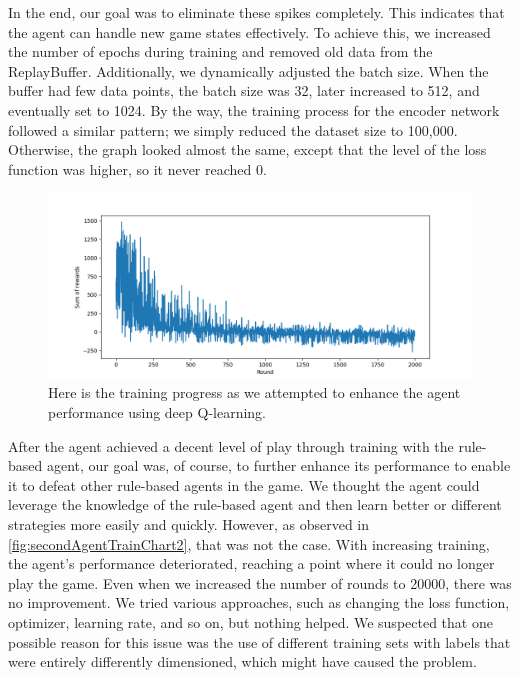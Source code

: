In the end, our goal was to eliminate these spikes completely. This indicates that the agent can handle new game states effectively. 
To achieve this, we increased the number of epochs during training and removed old data from the ReplayBuffer. Additionally, we dynamically 
adjusted the batch size. When the buffer had few data points, the batch size was 32, later increased to 512, and eventually set to 1024.
By the way, the training process for the encoder network followed a similar pattern; we simply reduced the dataset size to 100,000. Otherwise, 
the graph looked almost the same, except that the level of the loss function was higher, so it never reached 0.

\begin{figure}[H]
    \centering
    
    \includegraphics[width=\oneImgWidth]{images/secondAgentTrainChart2}%
    
    \captionadjust%
    \caption{\label{fig:secondAgentTrainChart2} Here is the training progress as we attempted to enhance the agent performance using deep Q-learning.
    }%
\end{figure}

After the agent achieved a decent level of play through training with the rule-based agent, our goal was, of course, 
to further enhance its performance to enable it to defeat other rule-based agents in the game. We thought the agent could 
leverage the knowledge of the rule-based agent and then learn better or different strategies more easily and quickly. 
However, as observed in \autoref{fig:secondAgentTrainChart2}, that was not the case. With increasing training, the agent's performance deteriorated, 
reaching a point where it could no longer play the game. Even when we increased the number of rounds to 20000, there was no improvement. 
We tried various approaches, such as changing the loss function, optimizer, learning rate, and so on, but nothing helped. We suspected that 
one possible reason for this issue was the use of different training sets with labels that were entirely 
differently dimensioned, which might have caused the problem.